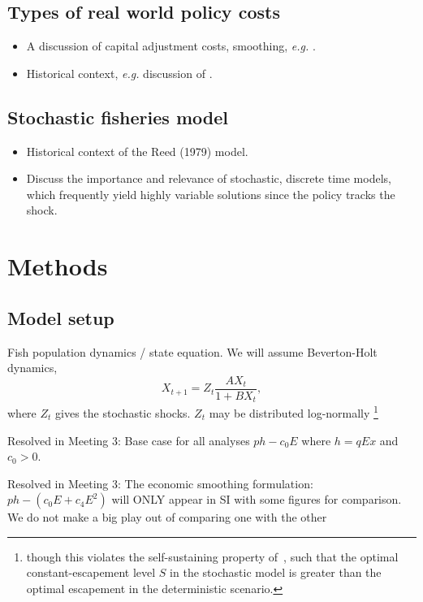 \documentclass[authoryear, review, 12pt]{elsarticle}
\begin{document}
\subsection{Types of real world policy costs}

\begin{itemize}
  \item A discussion of capital adjustment costs, smoothing, \emph{e.g.} \citet{Singh2006}.
  \item Historical context, \emph{e.g.} discussion of \citep{Bohm1974, Reed1979, Xepapadeas1992}.  
\end{itemize}
\subsection{Stochastic fisheries model}
\begin{itemize}
\item Historical context of the Reed (1979) model.  
\item Discuss the importance and relevance of stochastic, discrete time models, which frequently yield highly variable solutions since the policy tracks the shock.  
\end{itemize}


\section{Methods}

\subsection{Model setup}

  Fish population dynamics / state equation.  We will assume Beverton-Holt dynamics,
    \begin{equation} 
      X_{t+1} = Z_t \frac{A X_t}{1 + B X_t}, 
    \end{equation}
where $Z_t$ gives the stochastic shocks.  $Z_t$ may be distributed log-normally \footnote{though this violates the self-sustaining property of~\citet{Reed1979}, such that the optimal constant-escapement level $S$ in the stochastic model is greater than the optimal escapement in the deterministic scenario.}

{\color{blue}

Resolved in Meeting 3: Base case for all analyses $ph-c_0E$ where $h=qEx$ and $c_0>0$.

Resolved in Meeting 3: The economic smoothing formulation: $ph - (c_0 E+c_4 E^2)$ will ONLY appear in SI with some figures for comparison. We do not make a big play out of comparing one with the other
}
\end{document}
